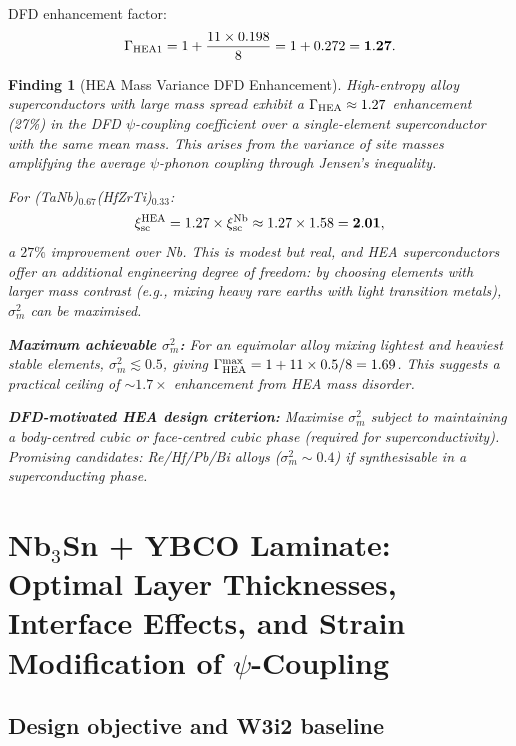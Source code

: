 \documentclass[11pt]{article}
\newtheorem{finding}{Finding}
\begin{document}
DFD enhancement factor:
\begin{equation}
\Gamma_{\rm HEA1} = 1 + \frac{11 \times 0.198}{8} = 1 + 0.272 = \mathbf{1.27}.
\label{eq:Gamma-HEA1}
\end{equation}

\begin{finding}[HEA Mass Variance DFD Enhancement]
\label{finding:HEA}
High-entropy alloy superconductors with large mass spread exhibit a
$\Gamma_{\rm HEA} \approx 1.27$ enhancement (27\%) in the DFD $\psi$-coupling
coefficient over a single-element superconductor with the same mean mass.
This arises from the variance of site masses amplifying the average
$\psi$-phonon coupling through Jensen's inequality.

For (TaNb)$_{0.67}$(HfZrTi)$_{0.33}$:
\begin{equation}
\xi_{\rm sc}^{\rm HEA} = 1.27 \times \xi_{\rm sc}^{\rm Nb}
\approx 1.27 \times 1.58 = \mathbf{2.01},
\end{equation}
a $27\%$ improvement over Nb. This is modest but real, and HEA
superconductors offer an additional engineering degree of freedom:
by choosing elements with larger mass contrast (e.g., mixing heavy
rare earths with light transition metals), $\sigma_m^2$ can be maximised.

\textbf{Maximum achievable $\sigma_m^2$:} For an equimolar alloy mixing
lightest and heaviest stable elements, $\sigma_m^2 \lesssim 0.5$, giving
$\Gamma_{\rm HEA}^{\rm max} = 1 + 11 \times 0.5/8 = 1.69$. This suggests
a practical ceiling of $\sim 1.7\times$ enhancement from HEA mass disorder.

\textbf{DFD-motivated HEA design criterion:} Maximise $\sigma_m^2$ subject
to maintaining a body-centred cubic or face-centred cubic phase (required
for superconductivity). Promising candidates: Re/Hf/Pb/Bi alloys
($\sigma_m^2 \sim 0.4$) if synthesisable in a superconducting phase.
\end{finding}

\section{Nb$_3$Sn + YBCO Laminate: Optimal Layer Thicknesses,
         Interface Effects, and Strain Modification of $\psi$-Coupling}
\label{sec:laminate}

\subsection{Design objective and W3i2 baseline}
\end{document}
